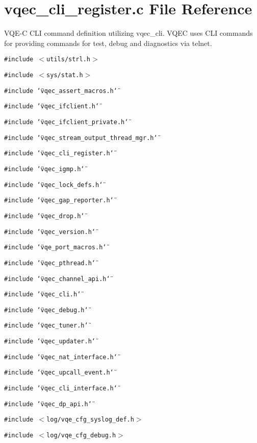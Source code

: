 \section{vqec\_\-cli\_\-register.c File Reference}
\label{vqec__cli__register_8c}
VQE-C CLI command definition utilizing vqec\_\-cli. VQEC uses CLI commands for providing commands for test, debug and diagnostics via telnet. 

{\tt \#include $<$utils/strl.h$>$}\par
{\tt \#include $<$sys/stat.h$>$}\par
{\tt \#include \char`\"{}vqec\_\-assert\_\-macros.h\char`\"{}}\par
{\tt \#include \char`\"{}vqec\_\-ifclient.h\char`\"{}}\par
{\tt \#include \char`\"{}vqec\_\-ifclient\_\-private.h\char`\"{}}\par
{\tt \#include \char`\"{}vqec\_\-stream\_\-output\_\-thread\_\-mgr.h\char`\"{}}\par
{\tt \#include \char`\"{}vqec\_\-cli\_\-register.h\char`\"{}}\par
{\tt \#include \char`\"{}vqec\_\-igmp.h\char`\"{}}\par
{\tt \#include \char`\"{}vqec\_\-lock\_\-defs.h\char`\"{}}\par
{\tt \#include \char`\"{}vqec\_\-gap\_\-reporter.h\char`\"{}}\par
{\tt \#include \char`\"{}vqec\_\-drop.h\char`\"{}}\par
{\tt \#include \char`\"{}vqec\_\-version.h\char`\"{}}\par
{\tt \#include \char`\"{}vqe\_\-port\_\-macros.h\char`\"{}}\par
{\tt \#include \char`\"{}vqec\_\-pthread.h\char`\"{}}\par
{\tt \#include \char`\"{}vqec\_\-channel\_\-api.h\char`\"{}}\par
{\tt \#include \char`\"{}vqec\_\-cli.h\char`\"{}}\par
{\tt \#include \char`\"{}vqec\_\-debug.h\char`\"{}}\par
{\tt \#include \char`\"{}vqec\_\-tuner.h\char`\"{}}\par
{\tt \#include \char`\"{}vqec\_\-updater.h\char`\"{}}\par
{\tt \#include \char`\"{}vqec\_\-nat\_\-interface.h\char`\"{}}\par
{\tt \#include \char`\"{}vqec\_\-upcall\_\-event.h\char`\"{}}\par
{\tt \#include \char`\"{}vqec\_\-cli\_\-interface.h\char`\"{}}\par
{\tt \#include \char`\"{}vqec\_\-dp\_\-api.h\char`\"{}}\par
{\tt \#include $<$log/vqe\_\-cfg\_\-syslog\_\-def.h$>$}\par
{\tt \#include $<$log/vqe\_\-cfg\_\-debug.h$>$}\par
